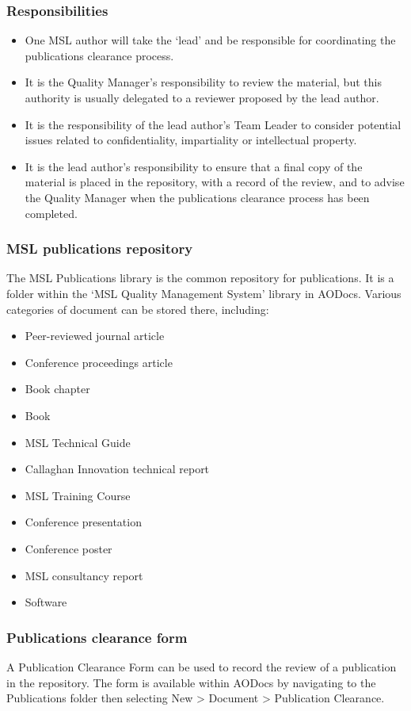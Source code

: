 \subsubsection{Responsibilities}
\begin{itemize}
\item  One MSL author will take the `lead' and be responsible for coordinating the publications clearance process.
\item  It is the Quality Manager's responsibility to review the material, but this authority is usually delegated to a reviewer proposed by the lead author.
\item  It is the responsibility of the lead author's Team Leader to consider potential issues related to confidentiality, impartiality or intellectual property.
\item  It is the lead author's responsibility to ensure that a final copy of the material is placed in the repository, with a record of the review, and to advise the Quality Manager when the publications clearance process has been completed.
\end{itemize}

\subsubsection{MSL publications repository}
 \label{sss:publications_repository}
The MSL Publications library is the common repository for publications. It is a folder within the `MSL Quality Management System' library in AODocs. Various categories of document can be stored there, including: 
\begin{itemize}
 \item Peer-reviewed journal article
 \item Conference proceedings article 
 \item Book chapter
 \item Book
 \item MSL Technical Guide
 \item Callaghan Innovation technical report 
 \item MSL Training Course 
 \item Conference presentation 
 \item Conference poster
 \item MSL consultancy report
 \item Software
\end{itemize}

\subsubsection{Publications clearance form}
A Publication Clearance Form can be used to record the review of a publication in the repository. The form is available within AODocs by navigating to the Publications folder then selecting New > Document > Publication Clearance.

